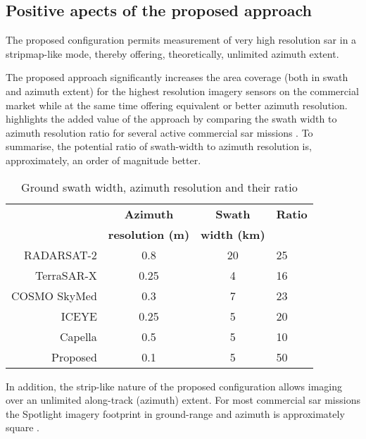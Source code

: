 \subsection{Positive apects of the proposed approach}
The proposed configuration permits measurement of very high resolution \gls{sar} in a stripmap-like mode, thereby offering, theoretically, unlimited azimuth extent.
\par
The proposed approach significantly increases the area coverage (both in swath and azimuth extent) for the highest resolution imagery sensors on the commercial market while at the same time offering equivalent or better azimuth resolution.  highlights the added value of the approach by comparing the swath width to azimuth resolution ratio for several active commercial \gls{sar} missions \cite{Brautigam2010, Fox2004, Porfilio2016, Mittermayer}. To summarise, the potential ratio of swath-width to azimuth resolution is, approximately, an order of magnitude better. 
\begin{table}[h!]
 \begin{center}
 \caption{Ground swath width, azimuth resolution and their ratio}
  \begin{tabular}{r|c|c|l}
   & {\bf Azimuth} & {\bf Swath} & {\bf Ratio}\\
   & {\bf resolution (m)} & {\bf width (km)} & {}\\\hline
   RADARSAT-2 & 0.8 & 20 & 25\\\hline
   TerraSAR-X & 0.25 & 4 & 16\\\hline
   COSMO SkyMed & 0.3 & 7 & 23\\\hline
   ICEYE & 0.25 & 5 & 20\\\hline
   Capella & 0.5& 5 & 10\\\hline
   Proposed & 0.1 & 5 & 50
  \end{tabular}
  \label{tb:reswidth}
 \end{center}
\end{table}
In addition, the strip-like nature of the proposed configuration allows imaging over an unlimited along-track (azimuth) extent. For most commercial \gls{sar} missions the Spotlight imagery footprint in ground-range and azimuth is approximately square \cite{Mittermayer}. 
\par
